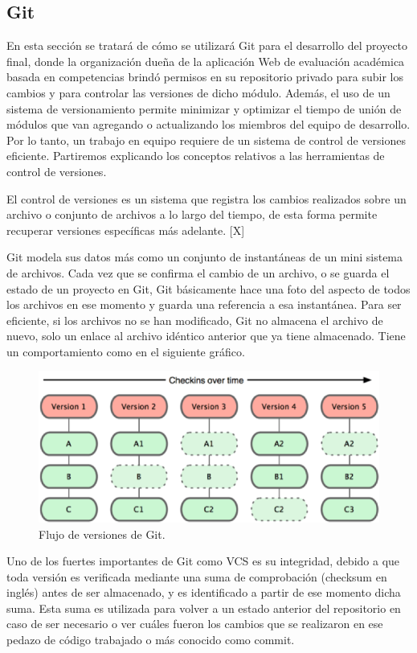 \subsection{Git}
En esta sección se tratará de cómo se utilizará Git para el desarrollo del proyecto final, donde la organización dueña de la aplicación Web de evaluación académica basada en competencias brindó permisos en su repositorio privado para subir los cambios y para controlar las versiones de dicho módulo. Además, el uso de un sistema de versionamiento permite minimizar y optimizar el tiempo de unión de módulos que van agregando o actualizando los miembros del equipo de desarrollo. Por lo tanto, un trabajo en equipo requiere de un sistema de control de versiones eficiente. Partiremos explicando los conceptos relativos a las herramientas de control de versiones.

El control de versiones es un sistema que registra los cambios realizados sobre un archivo o conjunto de archivos a lo largo del tiempo, de esta forma permite recuperar versiones específicas más adelante. [X]

Git modela sus datos más como un conjunto de instantáneas de un mini sistema de archivos. Cada vez que se confirma el cambio de un archivo, o se guarda el estado de un proyecto en Git, Git básicamente hace una foto del aspecto de todos los archivos en ese momento y guarda una referencia a esa instantánea. Para ser eficiente, si los archivos no se han modificado, Git no almacena el archivo de nuevo, solo un enlace al archivo idéntico anterior que ya tiene almacenado. Tiene un comportamiento como en el siguiente gráfico. 

\begin{figure}[H]
\centering
\includegraphics[width=125mm,scale=1]{Figuras/tecnologias/git_over_time}
\caption{Flujo de versiones de Git.}
  \label{graph_git}
\end{figure}

Uno de los fuertes importantes de Git como VCS es su integridad, debido a que toda versión es verificada mediante una suma de comprobación (checksum en inglés) antes de ser almacenado, y es identificado a partir de ese momento dicha suma. Esta suma es utilizada para volver a un estado anterior del repositorio en caso de ser necesario o ver cuáles fueron los cambios que se realizaron en ese pedazo de código trabajado o más conocido como commit. 

